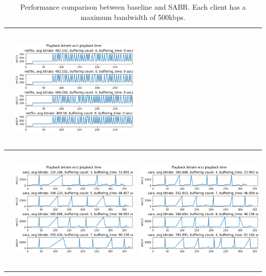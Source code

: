 \documentclass[12pt]{article}
\begin{document}
\begin{table}[H]
\begin{tabular}{ | m{1em} | c | c |}
\begin{minipage}{.45\textwidth}
    \end{minipage}
    & 
    \begin{minipage}{.45\textwidth}
      \includegraphics[width=\linewidth, height=60mm]{images/results/sabr_netflix.png}
    \end{minipage}
    \\ \hline
    \parbox[t]{2mm}{}
    &
    \begin{minipage}{.45\textwidth}
      \includegraphics[width=\linewidth, height=60mm]{images/results/baseline_sara.png}
    \end{minipage}
    &
    \begin{minipage}{.45\textwidth}
      \includegraphics[width=\linewidth, height=60mm]{images/results/sabr_sara.png}
    \end{minipage}
    \\ \hline
  \end{tabular}
  \caption{Performance comparison between baseline and SABR. Each client has a maximum bandwidth of 500kbps.}\label{tbl:baseline_sabr}
\end{table}
\end{document}

